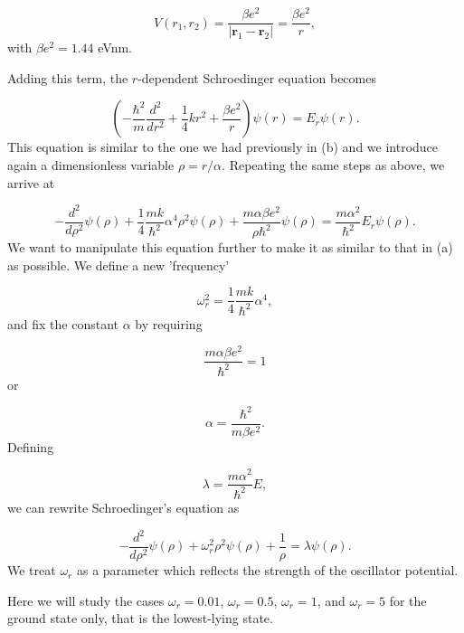 \documentclass[%
oneside,                 %
final,                   %
10pt]{article}
\begin{document}
\begin{equation*}
V(r_1,r_2) = \frac{\beta e^2}{|\mathbf{r}_1-\mathbf{r}_2|}=\frac{\beta e^2}{r},
\end{equation*}
with $\beta e^2=1.44$ eVnm.

Adding this term, the $r$-dependent Schroedinger equation becomes

\begin{equation*}
\left(  -\frac{\hbar^2}{m} \frac{d^2}{dr^2}+ \frac{1}{4}k r^2+\frac{\beta e^2}{r}\right)\psi(r)  = E_r \psi(r).
\end{equation*}
This equation is similar to the one we had previously in (b) and we introduce
again a dimensionless variable $\rho = r/\alpha$. Repeating the same
steps as above, we arrive at

\begin{equation*}
  -\frac{d^2}{d\rho^2} \psi(\rho) 
       + \frac{1}{4}\frac{mk}{\hbar^2} \alpha^4\rho^2\psi(\rho)+\frac{m\alpha \beta e^2}{\rho\hbar^2}\psi(\rho)  = 
\frac{m\alpha^2}{\hbar^2}E_r \psi(\rho) .
\end{equation*}
We want to manipulate this equation further to make it as similar to that in (a)
as possible. We define a new 'frequency'

\begin{equation*}
\omega_r^2=\frac{1}{4}\frac{mk}{\hbar^2} \alpha^4,
\end{equation*}
and fix the constant $\alpha$ by requiring

\begin{equation*}
\frac{m\alpha \beta e^2}{\hbar^2}=1
\end{equation*}
or

\begin{equation*}
\alpha = \frac{\hbar^2}{m\beta e^2}.
\end{equation*}
Defining

\begin{equation*}
\lambda = \frac{m\alpha^2}{\hbar^2}E,
\end{equation*}
we can rewrite Schroedinger's equation as

\begin{equation*}
  -\frac{d^2}{d\rho^2} \psi(\rho) + \omega_r^2\rho^2\psi(\rho) +\frac{1}{\rho} = \lambda \psi(\rho).
\end{equation*}
We treat $\omega_r$ as a parameter which reflects the strength of the oscillator potential.

Here we will study the cases $\omega_r = 0.01$, $\omega_r = 0.5$, $\omega_r =1$,
and $\omega_r = 5$   
for the ground state only, that is the lowest-lying state.
\end{document}
